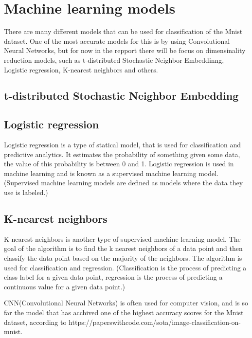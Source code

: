 \section{Machine learning models}\label{sec:machine-learning-models}
There are many different models that can be used for classification of the Mnist dataset. One of the most accurate models for this is by using Convolutional Neural Networks, but for now in the repport there will be focus on dimensinality reduction models, such as t-distributed Stochastic Neighbor Embeddinng, Logistic regression, K-nearest neighbors and others.

\subsection{t-distributed Stochastic Neighbor Embedding}


\subsection{Logistic regression}
Logistic regression is a type of statical model, that is used for classification and predictive analytics. It estimates the probability of something given some data, the value of this probability is between 0 and 1. Logistic regression is used in machine learning and is known as a supervised machine learning model. (Supervised machine learning models are defined as models where the data they use is labeled.)  

\subsection{K-nearest neighbors}
K-nearest neighbors is another type of supervised machine learning model. The goal of the algorithm is to find the k nearest neighbors of a data point and then classify the data point based on the majority of the neighbors. The algorithm is used for classification and regression. (Classification is the process of predicting a class label for a given data point, regression is the process of predicting a continuous value for a given data point.)

CNN(Convolutional Neural Networks) is often used for computer vision, and is so far the model that has acchived one of the highest accuracy scores for the Mnist dataset, according to https://paperswithcode.com/sota/image-classification-on-mnist.


